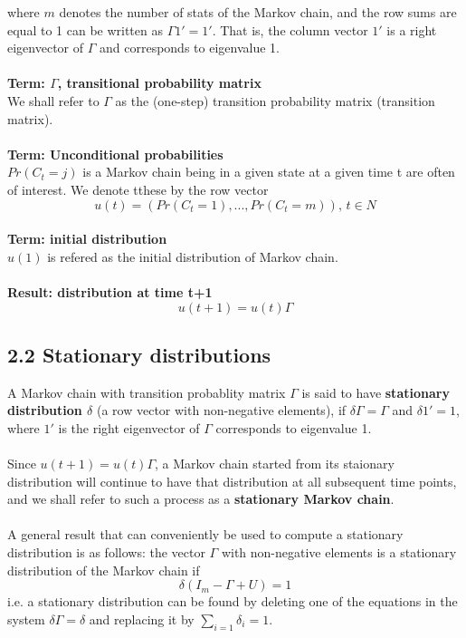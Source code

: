 \documentclass{article}
\begin{document}
where $m$ denotes the number of stats of the Markov chain, and the row sums are equal to 1 can be written as $\Gamma 1' = 1'$. That is, the column vector $1'$ is a right eigenvector of $\Gamma$ and corresponds to eigenvalue 1. \\
\\
\textbf{Term: $\Gamma$, transitional probability matrix} \\
We shall refer to $\Gamma$ as the (one-step) transition probability matrix (transition matrix). \\
\\
\textbf{Term: Unconditional probabilities} \\
$Pr(C_t = j)$ is a Markov chain being in a given state at a given time t are often of interest. We denote tthese by the row vector 
$$u(t) = (Pr(C_t = 1), ..., Pr(C_t = m)) \text{, $t \in N$}$$
\\
\textbf{Term: initial distribution} \\
$u(1)$ is refered as the initial distribution of Markov chain. \\
\\
\textbf{Result: distribution at time t+1}
$$u(t+1) = u(t) \Gamma$$

\subsection*{2.2 Stationary distributions}
A Markov chain with transition probablity matrix $\Gamma$ is said to have \textbf{stationary distribution $\delta$} (a row vector with non-negative elements), if $\delta \Gamma = \Gamma$ and $\delta 1' = 1$, where $1'$ is the right eigenvector of $\Gamma$ corresponds to eigenvalue 1.\\
\\
Since $u(t+1) = u(t) \Gamma$, a Markov chain started from its staionary distribution will continue to have that distribution at all subsequent time points, and we shall refer to such a process as a \textbf{stationary Markov chain}. \\
\\
A general result that can conveniently be used to compute a stationary distribution is as follows: the vector $\Gamma$ with non-negative elements is a stationary distribution of the Markov chain if 
$$\delta(I_m - \Gamma + U) = 1$$
i.e. a stationary distribution can be found by deleting one of the equations in the system $\delta \Gamma = \delta$ and replacing it by $\sum_{i=1} \delta_i = 1$.
\end{document}
